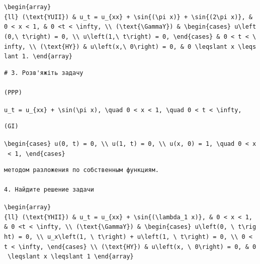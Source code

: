 \documentclass[
  ukrainian,
]{article}
\begin{document}
\texttt{\textbackslash{}begin\{array\}\{ll\}\ (\textbackslash{}text\{YUII\})\ \&\ u\_t\ =\ u\_\{xx\}\ +\ \textbackslash{}sin\{(\textbackslash{}pi\ x)\}\ +\ \textbackslash{}sin\{(2\textbackslash{}pi\ x)\},\ \&\ 0\ \textless{}\ x\ \textless{}\ 1,\ \&\ 0\ \textless{}t\ \textless{}\ \textbackslash{}infty,\ \textbackslash{}\textbackslash{}\ (\textbackslash{}text\{\textbackslash{}GammaY\})\ \&\ \textbackslash{}begin\{cases\}\ u\textbackslash{}left(0,\textbackslash{}\ t\textbackslash{}right)\ =\ 0,\ \textbackslash{}\textbackslash{}\ u\textbackslash{}left(1,\textbackslash{}\ t\textbackslash{}right)\ =\ 0,\ \textbackslash{}end\{cases\}\ \&\ 0\ \textless{}\ t\ \textless{}\ \textbackslash{}infty,\ \textbackslash{}\textbackslash{}\ (\textbackslash{}text\{HY\})\ \&\ u\textbackslash{}left(x,\textbackslash{}\ 0\textbackslash{}right)\ =\ 0,\ \&\ 0\ \textbackslash{}leqslant\ x\ \textbackslash{}leqslant\ 1.\ \textbackslash{}end\{array\}}

\begin{verbatim}
# 3. Розв'яжіть задачу

(PPP)
\end{verbatim}

\texttt{u\_t\ =\ u\_\{xx\}\ +\ \textbackslash{}sin(\textbackslash{}pi\ x),\ \textbackslash{}quad\ 0\ \textless{}\ x\ \textless{}\ 1,\ \textbackslash{}quad\ 0\ \textless{}\ t\ \textless{}\ \textbackslash{}infty,}

\begin{verbatim}
(GI)
\end{verbatim}

\texttt{\textbackslash{}begin\{cases\}\ u(0,\ t)\ =\ 0,\ \textbackslash{}\textbackslash{}\ u(1,\ t)\ =\ 0,\ \textbackslash{}\textbackslash{}\ u(x,\ 0)\ =\ 1,\ \textbackslash{}quad\ 0\ \textless{}\ x\ \textless{}\ 1,\ \textbackslash{}end\{cases\}}

\begin{verbatim}
методом разложения по собственным функциям.

4. Найдите решение задачи
\end{verbatim}

\texttt{\textbackslash{}begin\{array\}\{ll\}\ (\textbackslash{}text\{YHII\})\ \&\ u\_t\ =\ u\_\{xx\}\ +\ \textbackslash{}sin\{(\textbackslash{}lambda\_1\ x)\},\ \&\ 0\ \textless{}\ x\ \textless{}\ 1,\ \&\ 0\ \textless{}t\ \textless{}\ \textbackslash{}infty,\ \textbackslash{}\textbackslash{}\ (\textbackslash{}text\{\textbackslash{}GammaY\})\ \&\ \textbackslash{}begin\{cases\}\ u\textbackslash{}left(0,\ \textbackslash{}\ t\textbackslash{}right)\ =\ 0,\ \textbackslash{}\textbackslash{}\ u\_x\textbackslash{}left(1,\ \textbackslash{}\ t\textbackslash{}right)\ +\ u\textbackslash{}left(1,\ \textbackslash{}\ t\textbackslash{}right)\ =\ 0,\ \textbackslash{}\textbackslash{}\ 0\ \textless{}\ t\ \textless{}\ \textbackslash{}infty,\ \textbackslash{}end\{cases\}\ \textbackslash{}\textbackslash{}\ (\textbackslash{}text\{HY\})\ \&\ u\textbackslash{}left(x,\ \textbackslash{}\ 0\textbackslash{}right)\ =\ 0,\ \&\ 0\ \textbackslash{}leqslant\ x\ \textbackslash{}leqslant\ 1\ \textbackslash{}end\{array\}}
\end{document}
